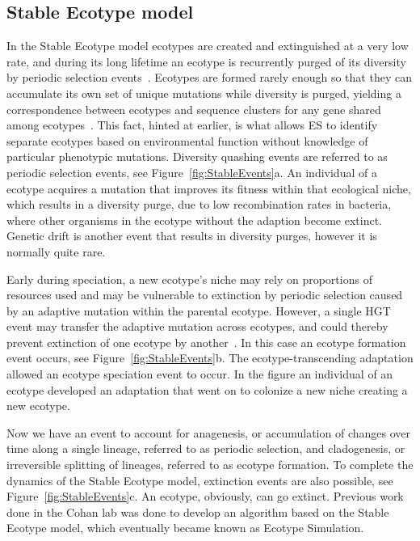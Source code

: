 \subsection*{Stable Ecotype model}
In the Stable Ecotype model ecotypes are created and extinguished at a very low rate, and during its long lifetime an ecotype is recurrently purged of its diversity by periodic selection events~\cite{cohan2007systematics}.
Ecotypes are formed rarely enough so that they can accumulate its own set of unique mutations while diversity is purged, yielding a correspondence between ecotypes and sequence clusters for any gene shared among ecotypes~\cite{cohan2008origins}.
This fact, hinted at earlier, is what allows ES to identify separate ecotypes based on environmental function without knowledge of particular phenotypic mutations.
Diversity quashing events are referred to as periodic selection events, see Figure~\ref{fig:StableEvents}a.
An individual of a ecotype acquires a mutation that improves its fitness within that ecological niche, which results in a diversity purge, due to low recombination rates in bacteria, where other organisms in the ecotype without the adaption become extinct.
Genetic drift is another event that results in diversity purges, however it is normally quite rare.

Early during speciation, a new ecotype's niche may rely on proportions of resources used and may be vulnerable to extinction by periodic selection caused by an adaptive mutation within the parental ecotype.
However, a single HGT event may transfer the adaptive mutation across ecotypes, and could thereby prevent extinction of one ecotype by another~\cite{cohan2008origins}.
In this case an ecotype formation event occurs, see Figure~\ref{fig:StableEvents}b.
The ecotype-transcending adaptation allowed an ecotype speciation event to occur. In the figure an individual of an ecotype developed an adaptation that went on to colonize a new niche creating a new ecotype.

Now we have an event to account for anagenesis, or accumulation of changes over time along a single lineage, referred to as periodic selection, and cladogenesis, or irreversible splitting of lineages, referred to as ecotype formation.
To complete the dynamics of the Stable Ecotype model, extinction events are also possible, see Figure~\ref{fig:StableEvents}c.
An ecotype, obviously, can go extinct.
Previous work done in the Cohan lab was done to develop an algorithm based on the Stable Ecotype model, which eventually became known as Ecotype Simulation.

